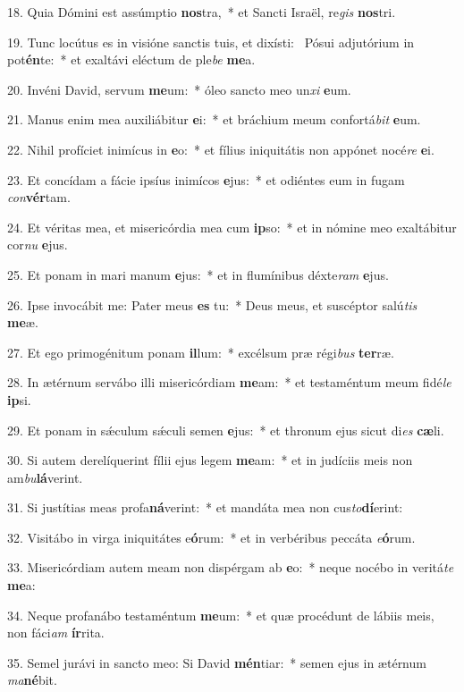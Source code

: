 18. Quia Dómini est assúmptio \textbf{nos}tra,~*  et Sancti Israël, re\textit{gis} \textbf{nos}tri.\

19. Tunc locútus es in visióne sanctis tuis, et dixísti: \dag\  Pósui adjutórium in pot\textbf{én}te:~*  et exaltávi eléctum de ple\textit{be} \textbf{me}a.\

20. Invéni David, servum \textbf{me}um:~*  óleo sancto meo un\textit{xi} \textbf{e}um.\

21. Manus enim mea auxiliábitur \textbf{e}i:~*  et bráchium meum confortá\textit{bit} \textbf{e}um.\

22. Nihil profíciet inimícus in \textbf{e}o:~*  et fílius iniquitátis non appónet nocé\textit{re} \textbf{e}i.\

23. Et concídam a fácie ipsíus inimícos \textbf{e}jus:~*  et odiéntes eum in fugam \textit{con}\textbf{vér}tam.\

24. Et véritas mea, et misericórdia mea cum \textbf{ip}so:~*  et in nómine meo exaltábitur cor\textit{nu} \textbf{e}jus.\

25. Et ponam in mari manum \textbf{e}jus:~*  et in flumínibus déxte\textit{ram} \textbf{e}jus.\

26. Ipse invocábit me: Pater meus \textbf{es} tu:~*  Deus meus, et suscéptor salú\textit{tis} \textbf{me}æ.\

27. Et ego primogénitum ponam \textbf{il}lum:~*  excélsum præ régi\textit{bus} \textbf{ter}ræ.\

28. In ætérnum servábo illi misericórdiam \textbf{me}am:~*  et testaméntum meum fidé\textit{le} \textbf{ip}si.\

29. Et ponam in sǽculum sǽculi semen \textbf{e}jus:~*  et thronum ejus sicut di\textit{es} \textbf{cæ}li.\

30. Si autem derelíquerint fílii ejus legem \textbf{me}am:~*  et in judíciis meis non am\textit{bu}\textbf{lá}verint.\

31. Si justítias meas profa\textbf{ná}verint:~*  et mandáta mea non cus\textit{to}\textbf{dí}erint:\

32. Visitábo in virga iniquitátes e\textbf{ó}rum:~*  et in verbéribus peccáta \textit{e}\textbf{ó}rum.\

33. Misericórdiam autem meam non dispérgam ab \textbf{e}o:~*  neque nocébo in veritá\textit{te} \textbf{me}a:\

34. Neque profanábo testaméntum \textbf{me}um:~*  et quæ procédunt de lábiis meis, non fáci\textit{am} \textbf{ír}rita.\

35. Semel jurávi in sancto meo: Si David \textbf{mén}tiar:~*  semen ejus in ætérnum \textit{ma}\textbf{né}bit.\

